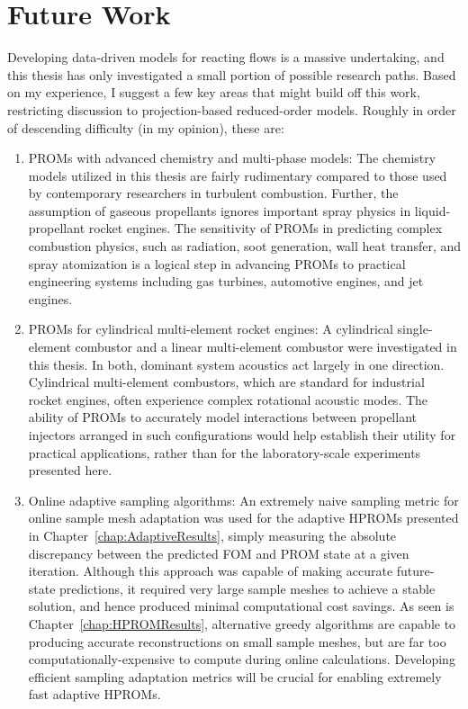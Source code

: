 \section{Future Work}

Developing data-driven models for reacting flows is a massive undertaking, and this thesis has only investigated a small portion of possible research paths. Based on my experience, I suggest a few key areas that might build off this work, restricting discussion to projection-based reduced-order models. Roughly in order of descending difficulty (in my opinion), these are:

\begin{enumerate}
    \item PROMs with advanced chemistry and multi-phase models: The chemistry models utilized in this thesis are fairly rudimentary compared to those used by contemporary researchers in turbulent combustion. Further, the assumption of gaseous propellants ignores important spray physics in liquid-propellant rocket engines. The sensitivity of PROMs in predicting complex combustion physics, such as radiation, soot generation, wall heat transfer, and spray atomization is a logical step in advancing PROMs to practical engineering systems including gas turbines, automotive engines, and jet engines.
    \item PROMs for cylindrical multi-element rocket engines: A cylindrical single-element combustor and a linear multi-element combustor were investigated in this thesis. In both, dominant system acoustics act largely in one direction. Cylindrical multi-element combustors, which are standard for industrial rocket engines, often experience complex rotational acoustic modes. The ability of PROMs to accurately model interactions between propellant injectors arranged in such configurations would help establish their utility for practical applications, rather than for the laboratory-scale experiments presented here.
    \item Online adaptive sampling algorithms: An extremely naive sampling metric for online sample mesh adaptation was used for the adaptive HPROMs presented in Chapter~\ref{chap:AdaptiveResults}, simply measuring the absolute discrepancy between the predicted FOM and PROM state at a given iteration. Although this approach was capable of making accurate future-state predictions, it required very large sample meshes to achieve a stable solution, and hence produced minimal computational cost savings. As seen is Chapter~\ref{chap:HPROMResults}, alternative greedy algorithms are capable to producing accurate reconstructions on small sample meshes, but are far too computationally-expensive to compute during online calculations. Developing efficient sampling adaptation metrics will be crucial for enabling extremely fast adaptive HPROMs.

\end{enumerate}
